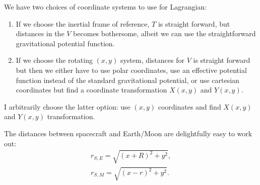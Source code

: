We have two choices of coordinate systems to use for Lagrangian:
\begin{enumerate}
    \item If we choose the inertial frame of reference, $T$ is straight forward, but distances in the $V$ becomes bothersome, albeit we can use the straightforward gravitational potential function.
    \item If we choose the rotating $(x,y)$ system, distances for $V$ is straight forward but then we either have to use polar coordinates, use an effective potential function instead of the standard gravitational potential, or use cartesian coordinates but find a coordinate transformation $X(x,y)$ and $Y(x,y)$.
\end{enumerate}
I arbitrarily choose the latter option: use $(x,y)$ coordinates and find $X(x,y)$ and $Y(x,y)$ transformation.

The distances between spacecraft and Earth/Moon are delightfully easy to work out:
\begin{align}
r_{S,E} = \sqrt{(x+R)^2+y^2}, \\
r_{S,M} = \sqrt{(x-r)^2+y^2}.
\end{align}

